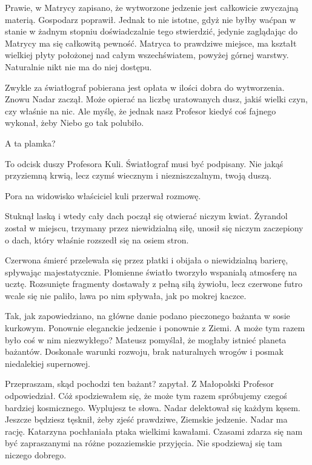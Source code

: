 \ds{} Prawie, w Matrycy zapisano, że wytworzone jedzenie jest całkowicie zwyczajną materią. \dm{} Gospodarz poprawił. \dm{}
Jednak to nie istotne, gdyż nie byłby waćpan w stanie w żadnym stopniu doświadczalnie tego stwierdzić, jedynie zaglądając do Matrycy ma się całkowitą pewność. 
Matryca to prawdziwe miejsce, ma kształt wielkiej płyty położonej nad całym wszechświatem, powyżej górnej warstwy. Naturalnie nikt nie ma do niej
dostępu. \de{}

\ds{} Zwykle za światłograf pobierana jest opłata w ilości dobra do wytworzenia. \dm{} Znowu Nadar zaczął. \dm{} Może opierać na liczbę uratowanych dusz, 
jakiś wielki czyn, czy właśnie na nic. Ale myślę, że jednak nasz Profesor kiedyś coś fajnego wykonał, żeby Niebo go tak polubiło. \de{}

\ds{} A ta plamka? \de{}

\ds{} To odcisk duszy Profesora Kuli. Światłograf musi być podpisany. Nie jakąś przyziemną krwią, lecz czymś wiecznym i niezniszczalnym, twoją duszą. \de{}

\ds{} Pora na widowisko \dm{} właściciel kuli przerwał rozmowę. \de{}

Stuknął laską i wtedy cały dach począł się otwierać niczym kwiat. 
Żyrandol został w miejscu, trzymany przez niewidzialną siłę, unosił się niczym zaczepiony o dach, który właśnie rozszedł się na osiem stron. 

Czerwona śmierć przelewała się przez płatki i obijała o niewidzialną barierę, spływając majestatycznie.
Płomienne światło tworzyło wspaniałą atmosferę na ucztę.
Rozsunięte fragmenty dostawały z pełną siłą żywiołu, lecz czerwone futro wcale się nie paliło, lawa po nim spływała, jak po mokrej kaczce.

Tak, jak zapowiedziano, na główne danie podano pieczonego bażanta w sosie kurkowym. 
Ponownie eleganckie jedzenie i ponownie z Ziemi. A może tym razem było coś w nim niezwykłego? Mateusz pomyślał, że mogłaby istnieć planeta bażantów. Doskonałe warunki rozwoju, brak naturalnych wrogów i posmak niedalekiej supernowej.
\begin{dialogue}
\ds{} Przepraszam, skąd pochodzi ten bażant? \dm{} zapytał.
\ds{} Z Małopolski \dm{} Profesor odpowiedział.
\ds{} Cóż spodziewałem się, że może tym razem spróbujemy czegoś bardziej kosmicznego.
\ds{} Wyplujesz te słowa. \dm{} Nadar delektował się każdym kęsem. \dm{} Jeszcze będziesz tęsknił, żeby zjeść prawdziwe, Ziemskie jedzenie. 
\ds{} Nadar ma rację. \dm{} Katarzyna pochłaniała ptaka wielkimi kawałami. \dm{} Czasami zdarza się nam być zapraszanymi na różne pozaziemskie przyjęcia. Nie spodziewaj się tam niczego dobrego.
\end{dialogue}

